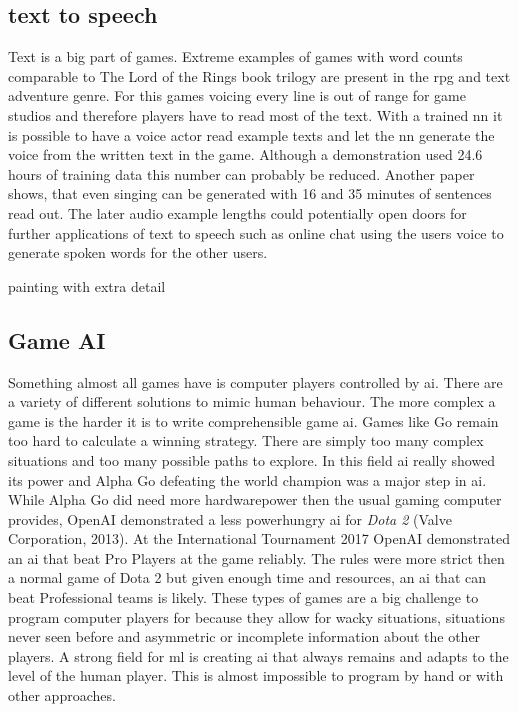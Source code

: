 \documentclass[10pt,a4paper]{article}
\begin{document}
\subsection{text to speech}
Text is a big part of games. Extreme examples of games with word counts comparable to The Lord of the Rings book trilogy are present in the \gls{rpg} and text adventure genre. For this games voicing every line is out of range for game studios and therefore players have to read most of the text. With a trained \gls{nn} it is possible to have a voice actor read example texts and let the \gls{nn} generate the voice from the written text in the game\cite{Shen2017}. Although a demonstration used 24.6 hours of training data this number can probably be reduced. Another paper shows, that even singing can be generated with 16 and 35 minutes of sentences read out\cite{Blaauw2017}. The later audio example lengths could potentially open doors for further applications of text to speech such as online chat using the users voice to generate spoken words for the other users.

\cite{Luan2018} painting with extra detail

\subsection{Game AI}
Something almost all games have is computer players controlled by \gls{ai}. There are a variety of different solutions to mimic human behaviour. The more complex a game is the harder it is to write comprehensible game \gls{ai}. Games like Go remain too hard to calculate a winning strategy. There are simply too many complex situations and too many possible paths to explore. In this field \gls{ai} really showed its power and Alpha Go defeating the world champion was a major step in \gls{ai}\cite{Silver2016}\cite{Silver2017}. While Alpha Go did need more hardwarepower then the usual gaming computer provides, OpenAI demonstrated a less powerhungry \gls{ai} for \textit{Dota 2} (Valve Corporation, 2013). At the International Tournament 2017 OpenAI demonstrated an \gls{ai} that beat Pro Players at the game reliably.\cite{Openai2017} The rules were more strict then a normal game of Dota 2 but given enough time and resources, an \gls{ai} that can beat Professional teams is likely. These types of games are a big challenge to program computer players for because they allow for wacky situations, situations never seen before and asymmetric or incomplete information about the other players. A strong field for \gls{ml} is creating \gls{ai} that always remains and adapts to the level of the human player. This is almost impossible to program by hand or with other approaches.
\end{document}
